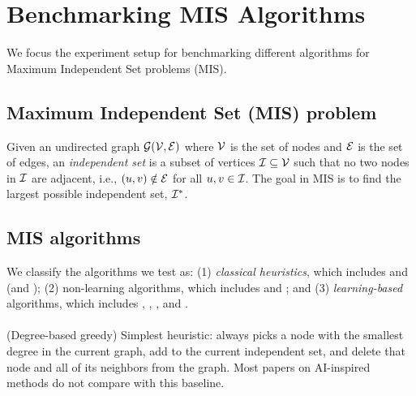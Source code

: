\section{Benchmarking MIS Algorithms}\label{sec:exp-setup}
We focus the experiment setup for benchmarking different algorithms for Maximum Independent Set problems (MIS). 

\subsection{Maximum Independent Set (MIS) problem}

 Given an undirected graph ${\mathcal{G}}({\mathcal{V}}, {\mathcal{E}})$ where ${\mathcal{V}}$ is the set of nodes and ${\mathcal{E}}$ is the set of edges, an {\em independent set} is a subset of vertices ${\mathcal{I}} \subseteq {\mathcal{V}}$ such that no two nodes in ${\mathcal{I}}$ are adjacent, i.e., $(u, v) \notin {\mathcal{E}}$ for all $u, v \in {\mathcal{I}}$. The goal in MIS is to find the largest possible independent set, ${\mathcal{I}}^*$. 


\subsection{MIS algorithms}\label{sec:algs-sketch}
We classify the algorithms we test as: (1) \textit{classical heuristics}, which includes \deggreedy and \kamis (\onlinemis and \redumis); 
(2)  non-learning algorithms, which includes \isco and \pcqo;
and (3) \textit{learning-based} algorithms, which includes \lwd, \gflownets, \difusco, and \diffuco.

\paragraph{\deggreedy}  (Degree-based greedy) Simplest heuristic: always picks a node with the smallest degree in the current graph, add to the current independent set, and delete that node and all of its neighbors from the graph. Most papers on AI-inspired methods do not  compare with this baseline.

